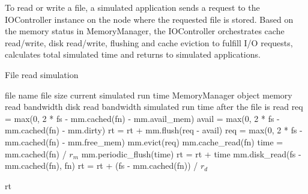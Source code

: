 \documentclass[conference]{IEEEtran}
\newcommand{\Desc}[2]{\State \makebox[2em][l]{#1}#2}
\begin{document}
			To read or write a file, a simulated application sends a request to the 
			IOController instance on the node where the requested file is stored.
			Based on the memory status in MemoryManager, the IOController 
			orchestrates cache read/write, disk read/write, flushing and cache eviction 
			to fulfill I/O requests, calculates total simulated time and returns to 
			simulated applications.
			
			\begin{algorithm}\caption{File read simulation}\label{alg:read}
				\small
				\begin{algorithmic}[1]
					\Input
        				\Desc{fn}{file name}
        				\Desc{fs}{file size}
						\Desc{rt}{current simulated run time}
						\Desc{mm}{MemoryManager object}
						\Desc{$r_m$}{memory read bandwidth}
						\Desc{$r_d$}{disk read bandwidth}
   					\EndInput
   					\Output
						\Desc{rt}{simulated run time after the file is read}
   					\EndOutput
					\State req = max(0, 2 * fs - mm.cached(fn) - mm.avail\_mem) 
					\State avail = max(0, 2 * fs - mm.cached(fn) - mm.dirty)
					\State rt = rt + mm.flush(req - avail)	
					\State req = max(0, 2 * fs - mm.cached(fn) - mm.free\_mem)
					\State mm.evict(req) 
					  
    					\State mm.cache\_read(fn) 
						 
    						\State time = mm.cached(fn) / $r_m$
    						\State mm.periodic\_flush(time) 
							\State rt = rt + time
						\EndIf
					\EndIf
					 
						\State mm.disk\_read(fs - mm.cached(fn), fn)
    					\State rt = rt + (fs - mm.cached(fn)) / $r_d$
					\EndIf					
					
					\State \Return rt
					
				\end{algorithmic}
			\end{algorithm}			
			
\end{document}
